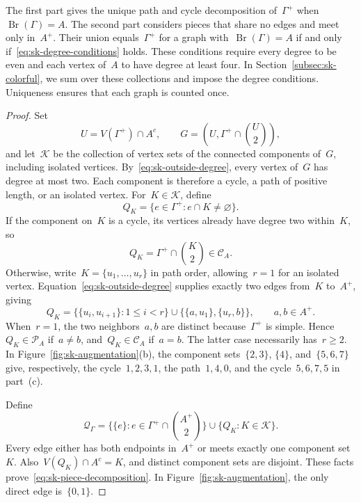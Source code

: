 \documentclass[letterpaper,11pt,reqno]{amsart}
\renewcommand{\leq}{\leqslant}
\renewcommand{\geq}{\geqslant}
\DeclareMathOperator{\Br}{Br}
\begin{document}
The first part gives the unique path and cycle decomposition of~$\Gamma^+$ when~$\Br(\Gamma)=A$. The second part considers pieces that share no edges and meet only in~$A^+$. Their union equals~$\Gamma^+$ for a graph with~$\Br(\Gamma)=A$ if and only if~\eqref{eq:sk-degree-conditions} holds. These conditions require every degree to be even and each vertex of~$A$ to have degree at least four. In Section~\ref{subsec:sk-colorful}, we sum over these collections and impose the degree conditions. Uniqueness ensures that each graph is counted once.

\begin{proof}
Set
\begin{equation*}
U=V(\Gamma^+)\cap A^c,\qquad
G=\left(U,\Gamma^+\cap\binom{U}{2}\right),
\end{equation*}
and let~$\mathcal K$ be the collection of vertex sets of the connected components of~$G$, including isolated vertices. By~\eqref{eq:sk-outside-degree}, every vertex of~$G$ has degree at most two. Each component is therefore a cycle, a path of positive length, or an isolated vertex. For~$K\in\mathcal K$, define
\begin{equation*}
Q_K=\{e\in\Gamma^+:e\cap K\ne\varnothing\}.
\end{equation*}
If the component on~$K$ is a cycle, its vertices already have degree two within~$K$, so
\begin{equation*}
Q_K=\Gamma^+\cap\binom{K}{2}\in\mathscr C_A.
\end{equation*}
Otherwise, write~$K=\{u_1,\ldots,u_r\}$ in path order, allowing~$r=1$ for an isolated vertex. Equation~\eqref{eq:sk-outside-degree} supplies exactly two edges from~$K$ to~$A^+$, giving
\begin{equation*}
Q_K=\bigl\{\{u_i,u_{i+1}\}:1\leq i<r\bigr\}
\cup\bigl\{\{a,u_1\},\{u_r,b\}\bigr\},
\qquad a,b\in A^+.
\end{equation*}
When~$r=1$, the two neighbors~$a,b$ are distinct because~$\Gamma^+$ is simple. Hence~$Q_K\in\mathscr P_A$ if~$a\ne b$, and~$Q_K\in\mathscr C_A$ if~$a=b$. The latter case necessarily has~$r\geq2$. In Figure~\ref{fig:sk-augmentation}(b), the component sets~$\{2,3\}$, $\{4\}$, and~$\{5,6,7\}$ give, respectively, the cycle~$1,2,3,1$, the path~$1,4,0$, and the cycle~$5,6,7,5$ in part~(c).

Define
\begin{equation*}
\mathcal Q_\Gamma=
\bigl\{\{e\}:e\in\Gamma^+\cap\binom{A^+}{2}\bigr\}
\cup\{Q_K:K\in\mathcal K\}.
\end{equation*}
Every edge either has both endpoints in~$A^+$ or meets exactly one component set~$K$. Also~$V(Q_K)\cap A^c=K$, and distinct component sets are disjoint. These facts prove~\eqref{eq:sk-piece-decomposition}. In Figure~\ref{fig:sk-augmentation}, the only direct edge is~$\{0,1\}$.


\end{proof}
\end{document}
